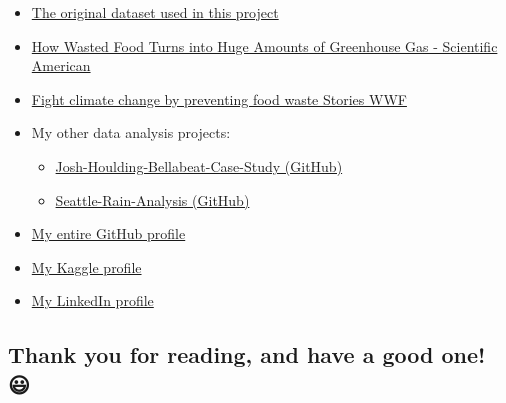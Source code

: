\documentclass[
]{article}
\providecommand{\tightlist}{%
  \setlength{\itemsep}{0pt}\setlength{\parskip}{0pt}}
\begin{document}
\begin{itemize}
\tightlist
\item
  \href{https://www.kaggle.com/datasets/joebeachcapital/food-waste}{The
  original dataset used in this project}
\item
  \href{https://www.scientificamerican.com/article/how-wasted-food-turns-into-huge-amounts-of-greenhouse-gas/}{How
  Wasted Food Turns into Huge Amounts of Greenhouse Gas - Scientific
  American}
\item
  \href{https://www.worldwildlife.org/stories/fight-climate-change-by-preventing-food-waste\#:~:text=But\%20wasted\%20food\%20isn\%27t,more\%20potent\%20than\%20carbon\%20dioxide.}{Fight
  climate change by preventing food waste \textbar{} Stories \textbar{}
  WWF}
\item
  My other data analysis projects:

  \begin{itemize}
  \tightlist
  \item
    \href{https://github.com/jhould007/Josh-Houlding-Bellabeat-Case-Study}{Josh-Houlding-Bellabeat-Case-Study
    (GitHub)}
  \item
    \href{https://github.com/jhould007/Seattle-Rain-Analysis}{Seattle-Rain-Analysis
    (GitHub)}
  \end{itemize}
\item
  \href{https://github.com/jhould007}{My entire GitHub profile}
\item
  \href{https://www.kaggle.com/joshhoulding}{My Kaggle profile}
\item
  \href{https://www.linkedin.com/in/joshuahoulding/}{My LinkedIn
  profile}
\end{itemize}

\hypertarget{thank-you-for-reading-and-have-a-good-one}{%
\subsection{\texorpdfstring{\textbf{Thank you for reading, and have a
good one!}
😃}{Thank you for reading, and have a good one! 😃}}\label{thank-you-for-reading-and-have-a-good-one}}
\end{document}
